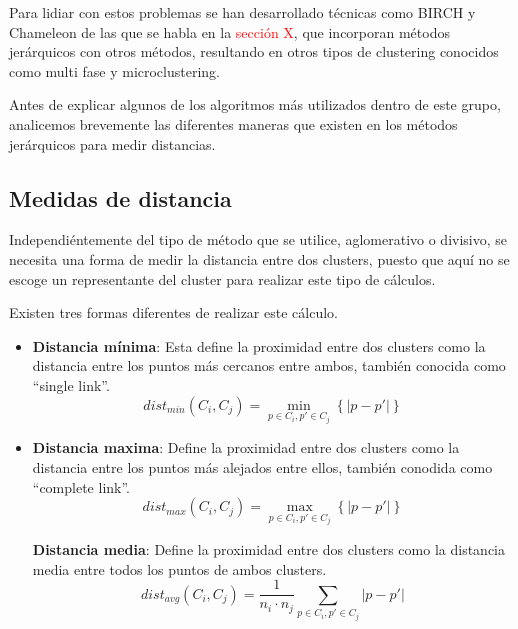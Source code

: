 \documentclass[3p,twocolumn]{elsarticle}
\begin{document}
Para lidiar con estos problemas se han desarrollado técnicas como BIRCH y Chameleon de las que se habla en la \textcolor{Red}{sección X}, que incorporan métodos jerárquicos con otros métodos, resultando en otros tipos de clustering conocidos como multi fase y microclustering.

Antes de explicar algunos de los algoritmos más utilizados dentro de este grupo, analicemos brevemente las diferentes maneras que existen en los métodos jerárquicos para medir distancias.




\subsection{Medidas de distancia} \label{Medidas de distancia}

Independiéntemente del tipo de método que se utilice, aglomerativo o divisivo, se necesita una forma de medir la distancia entre dos clusters, puesto que aquí no se escoge un representante del cluster para realizar este tipo de cálculos. 

Existen tres formas diferentes de realizar este cálculo. \\

\begin{itemize}
  \item \textbf{Distancia mínima}: Esta define la proximidad entre dos clusters como la distancia entre los puntos más cercanos entre ambos, también conocida como ``single link''.
\begin{equation} dist_{min}(C_i, C_j) =  \min_{p \in C_i, p' \in C_j} \left\{|p - p'|\right\} \end{equation}

  \item \textbf{Distancia maxima}: Define la proximidad entre dos clusters como la distancia entre los puntos más alejados entre ellos, también conodida como ``complete link''.
\begin{equation} dist_{max}(C_i, C_j) =  \max_{p \in C_i, p' \in C_j} \left\{|p - p'|\right\} \end{equation}

\textbf{Distancia media}: Define la proximidad entre dos clusters como la distancia media entre todos los puntos de ambos clusters.
\begin{equation} dist_{avg}(C_i, C_j) = \frac{1}{n_i \cdot n_j} \sum_{p \in C_i, p' \in C_j} |p - p'|  \end{equation}
\end{itemize}
\end{document}
